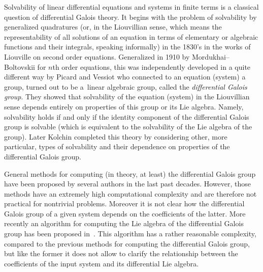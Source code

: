 \documentclass[11pt]{article}
\numberwithin{equation}{section}
\begin{document}
Solvability of linear differential equations and systems in finite terms is a classical question of
differential Galois theory. It begins with the problem of solvability by generalized quadratures
(or, in the Liouvillian sense, which means the representability of all solutions of an equation in
terms of elementary or algebraic functions and their integrals, speaking informally) in the 1830's
in the works of Liouville on second order equations. Generalized in 1910 by Mordukhai--Boltovskii for
$n$th order equations, this was independently developed in a quite different way by Picard and Vessiot
who connected to an equation (system) a group, turned out to be a~linear algebraic group, called the
{\it differential Galois group}. They showed that solvability of the equation (system) in the Liouvillian
sense depends entirely on properties of this group or its Lie algebra. Namely, solvability holds if and
only if the identity component of the differential Galois group is solvable (which is equivalent to the
solvability of the Lie algebra of the group). Later Kolchin completed this theory by considering other,
more particular, types of solvability and their dependence on properties of the differential Galois group.

General methods for computing (in theory, at least) the differential Galois group have been proposed by several authors \cite{CoSi99,Fe15a,Hr02,Ho07b} in the last past decades. However, those methods have an extremely high computational complexity and are therefore not practical for nontrivial problems. Moreover it is not clear how the differential Galois group of a given system depends on the coefficients of the latter. More recently an algorithm for computing the Lie algebra of the differential Galois group has been proposed in~\cite{BCDW16}. This algorithm has a rather reasonable complexity, compared to the previous methods for computing the differential Galois group, but like the former it does not allow to clarify the relationship between the coefficients of the input system and its differential Lie algebra.
\end{document}
